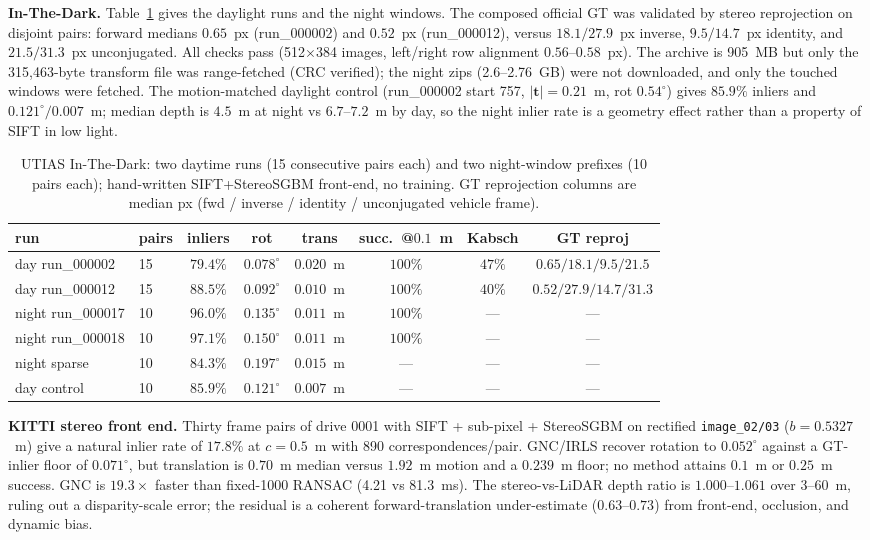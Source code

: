 \noindent\textbf{In-The-Dark.} Table~\ref{tab:inthedark} gives the daylight runs and the night
windows. The composed official GT was validated by stereo reprojection on disjoint pairs: forward
medians $0.65$~px (run\_000002) and $0.52$~px (run\_000012), versus $18.1/27.9$~px inverse,
$9.5/14.7$~px identity, and $21.5/31.3$~px unconjugated. All checks pass (512$\times$384 images,
left/right row alignment $0.56$--$0.58$~px). The archive is 905~MB but only the 315{,}463-byte
transform file was range-fetched (CRC verified); the night zips (2.6--2.76~GB) were not downloaded,
and only the touched windows were fetched. The motion-matched daylight control (run\_000002 start
757, $|\mathbf{t}|=0.21$~m, rot $0.54^\circ$) gives $85.9\%$ inliers and $0.121^\circ/0.007$~m;
median depth is $4.5$~m at night vs $6.7$--$7.2$~m by day, so the night inlier rate is a geometry
effect rather than a property of SIFT in low light.

\begin{table}[t]
\caption{UTIAS In-The-Dark: two daytime runs (15 consecutive pairs each) and two night-window
prefixes (10 pairs each); hand-written SIFT+StereoSGBM front-end, no training. GT reprojection
columns are median px (fwd / inverse / identity / unconjugated vehicle frame).}
\label{tab:inthedark}
\centering
\footnotesize
\setlength{\tabcolsep}{3pt}
\begin{tabular}{llcccccc}
\toprule
run & pairs & inliers & rot & trans & succ.\ @$0.1$~m & Kabsch & GT reproj \\
\midrule
day run\_000002 & 15 & $79.4\%$ & $0.078^\circ$ & $0.020$~m & $100\%$ & $47\%$ & $0.65/18.1/9.5/21.5$ \\
day run\_000012 & 15 & $88.5\%$ & $0.092^\circ$ & $0.010$~m & $100\%$ & $40\%$ & $0.52/27.9/14.7/31.3$ \\
night run\_000017 & 10 & $96.0\%$ & $0.135^\circ$ & $0.011$~m & $100\%$ & --- & --- \\
night run\_000018 & 10 & $97.1\%$ & $0.150^\circ$ & $0.011$~m & $100\%$ & --- & --- \\
night sparse & 10 & $84.3\%$ & $0.197^\circ$ & $0.015$~m & --- & --- & --- \\
day control & 10 & $85.9\%$ & $0.121^\circ$ & $0.007$~m & --- & --- & --- \\
\bottomrule
\end{tabular}
\end{table}

\noindent\textbf{KITTI stereo front end.} Thirty frame pairs of drive 0001 with SIFT + sub-pixel +
StereoSGBM on rectified \texttt{image\_02/03} ($b=0.5327$~m) give a natural inlier rate of $17.8\%$
at $c=0.5$~m with 890 correspondences/pair. GNC/IRLS recover rotation to $0.052^\circ$ against a
GT-inlier floor of $0.071^\circ$, but translation is $0.70$~m median versus $1.92$~m motion and a
$0.239$~m floor; no method attains $0.1$~m or $0.25$~m success. GNC is $19.3\times$ faster than
fixed-1000 RANSAC (4.21 vs 81.3~ms). The stereo-vs-LiDAR depth ratio is $1.000$--$1.061$ over
3--60~m, ruling out a disparity-scale error; the residual is a coherent forward-translation
under-estimate ($0.63$--$0.73$) from front-end, occlusion, and dynamic bias.

